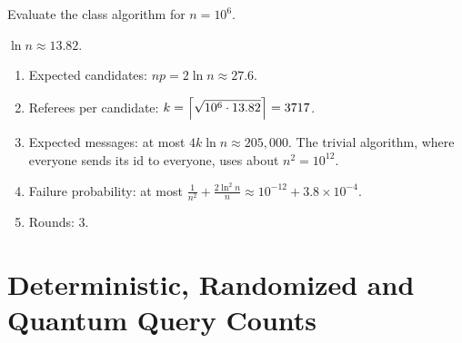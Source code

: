 \begin{exercisebox}
\begin{pproblem}[Numbers for $n = 1{,}000{,}000$]\label{pp:leader-num}
    Evaluate the class algorithm for $n = 10^6$.
\end{pproblem}
\tcblower
\begin{wsolution}
    $\ln n \approx 13.82$.
    \begin{enumerate}
        \item Expected candidates: $np = 2 \ln n \approx 27.6$.
        \item Referees per candidate: $k = \left\lceil\sqrt{10^6 \cdot 13.82}\right\rceil = 3717$.
        \item Expected messages: at most $4k \ln n \approx 205{,}000$. The trivial algorithm, where
              everyone sends its id to everyone, uses about $n^2 = 10^{12}$.
        \item Failure probability: at most
              $\frac{1}{n^2} + \frac{2 \ln^2 n}{n} \approx 10^{-12} + 3.8 \times 10^{-4}$.
        \item Rounds: $3$. \qedhere
    \end{enumerate}
\end{wsolution}
\end{exercisebox}

\section{Deterministic, Randomized and Quantum Query Counts}\label{sec:counts}

